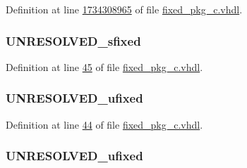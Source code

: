 Definition at line \hyperlink{fixed__pkg__c_8vhdl_source_l1734308965}{1734308965} of file \hyperlink{fixed__pkg__c_8vhdl_source}{fixed\+\_\+pkg\+\_\+c.\+vhdl}.

\hypertarget{classfixed__pkg_a9c2051e860dce0b23561ee440c917fa0}{}
\subsubsection[{U\+\_\+sfixed}]{ {\bfseries {\bfseries {\bf U\+N\+R\+E\+S\+O\+L\+V\+E\+D\+\_\+sfixed}} \textcolor{vhdlchar}{ }} \hspace{0.3cm}{\ttfamily [Subtype]}}\label{classfixed__pkg_a9c2051e860dce0b23561ee440c917fa0}


Definition at line \hyperlink{fixed__pkg__c_8vhdl_source_l00045}{45} of file \hyperlink{fixed__pkg__c_8vhdl_source}{fixed\+\_\+pkg\+\_\+c.\+vhdl}.

\hypertarget{classfixed__pkg_adf035861826c6e6f4511e21b904f553f}{}
\subsubsection[{U\+\_\+ufixed}]{ {\bfseries {\bfseries {\bf U\+N\+R\+E\+S\+O\+L\+V\+E\+D\+\_\+ufixed}} \textcolor{vhdlchar}{ }} \hspace{0.3cm}{\ttfamily [Subtype]}}\label{classfixed__pkg_adf035861826c6e6f4511e21b904f553f}


Definition at line \hyperlink{fixed__pkg__c_8vhdl_source_l00044}{44} of file \hyperlink{fixed__pkg__c_8vhdl_source}{fixed\+\_\+pkg\+\_\+c.\+vhdl}.

\hypertarget{classfixed__pkg_ac19c9d4a114e6044c82c35cc40221922}{}
\subsubsection[{ufixed}]{ {\bfseries {\bfseries {\bf U\+N\+R\+E\+S\+O\+L\+V\+E\+D\+\_\+ufixed}} \textcolor{vhdlchar}{ }} \hspace{0.3cm}{\ttfamily [Subtype]}}\label{classfixed__pkg_ac19c9d4a114e6044c82c35cc40221922}


